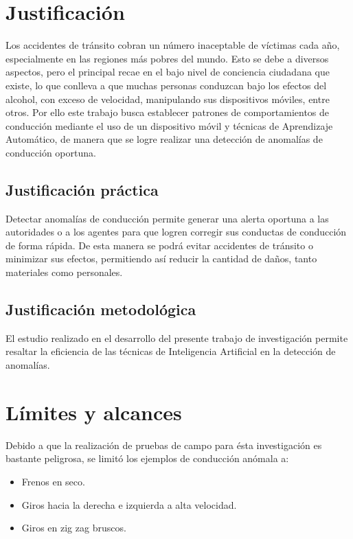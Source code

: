 \section{Justificación}

Los accidentes de tránsito cobran un número inaceptable de víctimas cada a\~{n}o, especialmente en las regiones m\'{a}s pobres del mundo. Esto se debe a diversos aspectos, pero el principal recae en el bajo nivel de conciencia ciudadana que existe, lo que conlleva a que muchas personas conduzcan bajo los efectos del alcohol, con exceso de velocidad, manipulando sus dispositivos m\'{o}viles, entre otros. Por ello este trabajo busca establecer patrones de comportamientos de conducci\'{o}n mediante el uso de un dispositivo m\'{o}vil y t\'{e}cnicas de Aprendizaje Autom\'{a}tico, de manera que se logre realizar una detecci\'{o}n de anomal\'{i}as de conducci\'{o}n oportuna.

\subsection{Justificaci\'{o}n pr\'{a}ctica}

Detectar anomal\'{i}as de conducci\'{o}n permite generar una alerta oportuna a las autoridades o a los agentes para que logren corregir sus conductas de conducci\'{o}n de forma r\'{a}pida. De esta manera se podr\'{a} evitar accidentes de tr\'{a}nsito o minimizar sus efectos, permitiendo as\'{i} reducir la cantidad de da\~{n}os, tanto materiales como personales.

\subsection{Justificaci\'{o}n metodol\'{o}gica}

El estudio realizado en el desarrollo del presente trabajo de investigaci\'{o}n permite resaltar la eficiencia de las t\'{e}cnicas de Inteligencia Artificial en la detecci\'{o}n de anomal\'{i}as.

\section{L\'{i}mites y alcances}

Debido a que la realizaci\'{o}n de pruebas de campo para \'{e}sta investigaci\'{o}n es bastante peligrosa, se limit\'{o} los ejemplos de conducci\'{o}n an\'{o}mala a:

\begin{itemize}
\item Frenos en seco.
\item Giros hacia la derecha e izquierda a alta velocidad.
\item Giros en zig zag bruscos.
\end{itemize}

